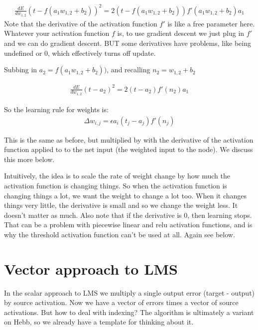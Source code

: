 \begin{eqnarray*}
\frac{dE}{dw_{1,2}} (t - f(a_1w_{1,2} + b_2))^2   = 2 (t - f(a_1w_{1,2} + b_2)) f'(a_1w_{1,2} + b_2) a_1 
\end{eqnarray*}
Note that the derivative of the activation function $f'$ is like a free parameter here. Whatever your activation function $f$ is, to use gradient descent we just plug in $f'$ and we can do gradient descent. BUT some derivatives have problems, like being undefined or 0, which effectively turns off update.

Subbing in $a_2 = f(a_1w_{1,2} + b_2))$, and recalling $n_2 = w_{1,2} + b_2$ 

\begin{eqnarray*}
\frac{dE}{dw_{1,2}} (t - a_2)^2   = 2 (t - a_2) f'(n_2) a_1 
\end{eqnarray*}

So the learning rule for weights is:
\begin{eqnarray*}
\Delta w_{i,j}  =  \epsilon a_i (t_j - a_j) f'(n_j)
\end{eqnarray*} 

This is the same as before, but multiplied by with the derivative of the activation function applied to to the net input (the weighted input to the node). We discuss this more below.

Intuitively, the idea is to scale the rate of weight change by how much the activation function is changing things. So when the activation function is changing things a lot, we want the weight to change a lot too. When it changes things very little, the derivative is small and so we change the weight less.  It doesn't matter as much.  Also note that if the derivative is 0, then learning stops. That can be a problem with piecewise linear and relu activation functions, and is why the threshold activation function can't be used at all.  Again see below.

\section{Vector approach to LMS}


In the scalar approach to LMS we multiply a single output error (target - output) by source activation. Now we have a vector of errors times a vector of source activations. But how to deal with indexing?  The algorithm is ultimately a variant on Hebb, so we already have a template for thinking about it.

